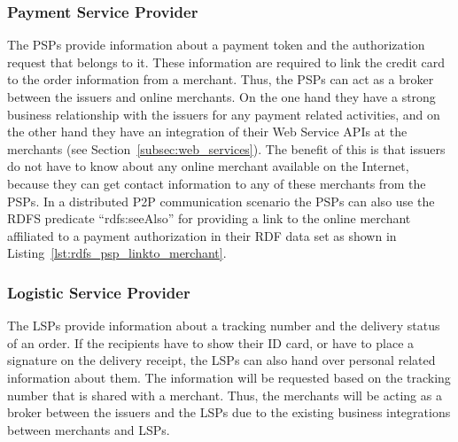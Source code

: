 
\subsubsection{Payment Service Provider}
\label{subsub:prep_info_psp}

The \gls{PSP}s provide information about a payment token and the authorization request that belongs to it. These information are required to link the credit card to the order information from a merchant. Thus, the \gls{PSP}s can act as a broker between the issuers and online merchants. On the one hand they have a strong business relationship with the issuers for any payment related activities, and on the other hand they have an integration of their Web Service \gls{API}s at the merchants (see Section~\ref{subsec:web_services}). The benefit of this is that issuers do not have to know about any online merchant available on the Internet, because they can get contact information to any of these merchants from the \gls{PSP}s. In a distributed \gls{P2P} communication scenario the \gls{PSP}s can also use the \gls{RDFS} predicate ``rdfs:seeAlso'' for providing a link to the online merchant affiliated to a payment authorization in their \gls{RDF} data set as shown in Listing~\ref{lst:rdfs_psp_linkto_merchant}. \@


\subsubsection{Logistic Service Provider}
\label{subsub:prep_info_lsp}

The \gls{LSP}s provide information about a tracking number and the delivery status of an order. If the recipients have to show their ID card, or have to place a signature on the delivery receipt, the \gls{LSP}s can also hand over personal related information about them. The information will be requested based on the tracking number that is shared with a merchant. Thus, the merchants will be acting as a broker between the issuers and the \gls{LSP}s due to the existing business integrations between merchants and \gls{LSP}s.

